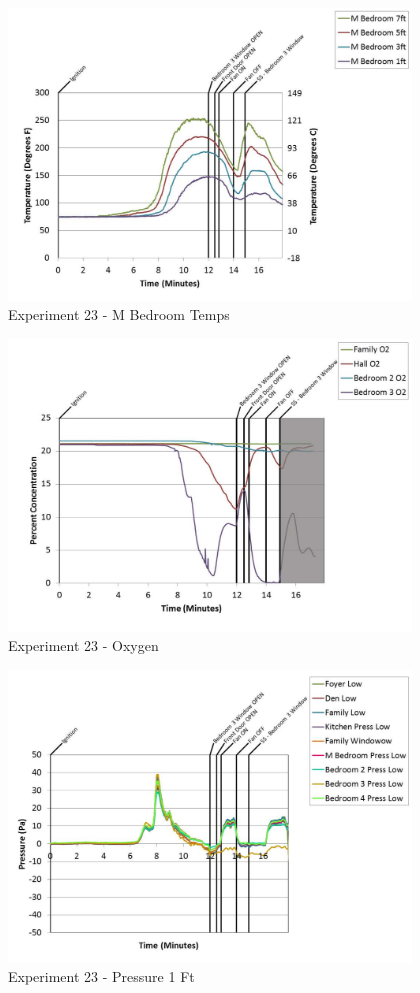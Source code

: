 \documentclass{article}
\begin{document}
\begin{appendices}
	\begin{figure}[h!]
		\centering
		\includegraphics[height=3.05in]{0_Images/Results_Charts/Exp_23_Charts/MBedroomTemps.pdf}
		\caption{Experiment 23 - M Bedroom Temps}
	\end{figure}
 
	\clearpage

	\begin{figure}[h!]
		\centering
		\includegraphics[height=3.05in]{0_Images/Results_Charts/Exp_23_Charts/Oxygen.pdf}
		\caption{Experiment 23 - Oxygen}
	\end{figure}
 

	\begin{figure}[h!]
		\centering
		\includegraphics[height=3.05in]{0_Images/Results_Charts/Exp_23_Charts/Pressure1Ft.pdf}
		\caption{Experiment 23 - Pressure 1 Ft}
	\end{figure}
 

\end{appendices}
\end{document}

